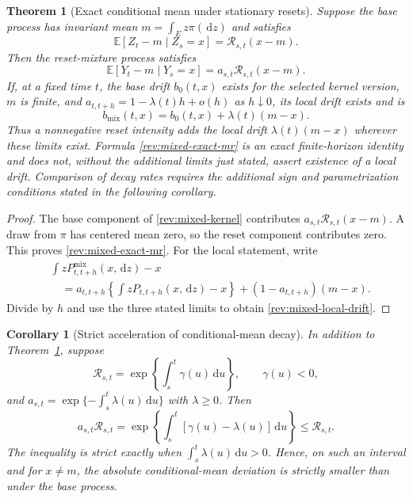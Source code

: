 \documentclass[11pt]{article}
\newtheorem{theorem}[definition]{Theorem}
\newtheorem{corollary}[definition]{Corollary}
\theoremstyle{remark}
\newcommand{\E}{\mathbb E}
\newcommand{\dd}{\,\mathrm d}
\begin{document}
\begin{theorem}[Exact conditional mean under stationary resets]
\label{rev:thm-mixed-mr}
Suppose the base process has invariant mean
$m=\int_Ez\pi(\dd z)$ and satisfies
\begin{equation}
\E[Z_t-m\mid Z_s=x]=\mathcal R_{s,t}(x-m).
\label{rev:base-mr-for-mix}
\end{equation}
Then the reset-mixture process satisfies
\begin{equation}
\E[Y_t-m\mid Y_s=x]=a_{s,t}\mathcal R_{s,t}(x-m).
\label{rev:mixed-exact-mr}
\end{equation}
If, at a fixed time $t$, the base drift $b_0(t,x)$ exists for the selected
kernel version, $m$ is finite, and
$a_{t,t+h}=1-\lambda(t)h+o(h)$ as $h\downarrow0$, its local drift exists and is
\begin{equation}
b_{\mathrm{mix}}(t,x)=b_0(t,x)+\lambda(t)(m-x).
\label{rev:mixed-local-drift}
\end{equation}
Thus a nonnegative reset intensity adds the local drift
$\lambda(t)(m-x)$ wherever these limits exist.  Formula
\eqref{rev:mixed-exact-mr} is an exact finite-horizon identity and does not,
without the additional limits just stated, assert existence of a local drift.
Comparison of decay rates requires the additional sign and parametrization
conditions stated in the following corollary.
\end{theorem}

\begin{proof}
The base component of \eqref{rev:mixed-kernel} contributes
$a_{s,t}\mathcal R_{s,t}(x-m)$.  A draw from $\pi$ has centered mean zero, so the reset
component contributes zero.  This proves \eqref{rev:mixed-exact-mr}.  For the
local statement, write
\begin{align*}
&\int zP^{\mathrm{mix}}_{t,t+h}(x,\dd z)-x\\
&\quad=a_{t,t+h}\left\{\int zP_{t,t+h}(x,\dd z)-x\right\}
 +(1-a_{t,t+h})(m-x).
\end{align*}
Divide by $h$ and use the three stated limits to obtain
\eqref{rev:mixed-local-drift}.
\end{proof}

\begin{corollary}[Strict acceleration of conditional-mean decay]
\label{rev:cor-mixed-acceleration}
In addition to Theorem~\ref{rev:thm-mixed-mr}, suppose
\[
 \mathcal R_{s,t}=\exp\!\left\{\int_s^t\gamma(u)\dd u\right\},
 \qquad \gamma(u)<0,
\]
and $a_{s,t}=\exp\{-\int_s^t\lambda(u)\dd u\}$ with $\lambda\ge0$.
Then
\[
 a_{s,t}\mathcal R_{s,t}
 =\exp\!\left\{\int_s^t[\gamma(u)-\lambda(u)]\dd u\right\}
 \le \mathcal R_{s,t}.
\]
The inequality is strict exactly when
$\int_s^t\lambda(u)\dd u>0$.  Hence, on such an interval and for $x\ne m$,
the absolute conditional-mean deviation is strictly smaller than under the
base process.
\end{corollary}
\end{document}
